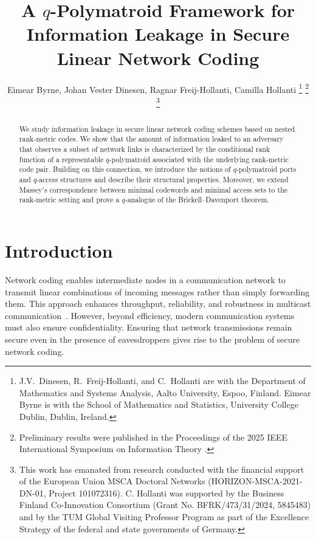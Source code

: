 \documentclass[onecolumn,draftclsnofoot,12pt]{IEEEtran}
\theoremstyle{plain} %
\theoremstyle{definition}
\begin{document}
\title{A $q$-Polymatroid Framework for Information Leakage in Secure Linear Network Coding}
\author{Eimear Byrne, Johan Vester Dinesen, Ragnar Freij-Hollanti, Camilla Hollanti
\thanks{J.V.~Dinesen, R.~Freij-Hollanti, and  C.~Hollanti are with the Department of Mathematics and Systems Analysis, Aalto University, Espoo, Finland. Eimear Byrne is with the School of Mathematics and Statistics, University College Dublin, Dublin, Ireland.}
\thanks{Preliminary results were published in the Proceedings of the 2025 IEEE International Symposium on Information Theory \cite{dinesen2025secretsharingrankmetric}.}
\thanks{This work has emanated from research conducted with the ﬁnancial support of the European Union MSCA Doctoral Networks (HORIZON-MSCA-2021-DN-01, Project 101072316). C. Hollanti was supported by the Business Finland Co-Innovation Consortium (Grant No. BFRK/473/31/2024, 5845483) and by the TUM Global Visiting Professor Program as part of the Excellence Strategy of the federal and state governments of Germany.}
}


\maketitle

\begin{abstract}
We study information leakage in secure linear network coding schemes based on nested rank-metric codes. We show that the amount of information leaked to an adversary that observes a subset of network links is characterized by the conditional rank function of a representable $q$-polymatroid associated with the underlying rank-metric code pair. Building on this connection, we introduce the notions of $q$-polymatroid ports and $q$-access structures and describe their structural properties. Moreover, we extend Massey's correspondence between minimal codewords and minimal access sets to the rank-metric setting and prove a $q$-analogue of the Brickell--Davenport theorem.

\end{abstract}

\section{Introduction}

Network coding enables intermediate nodes in a communication network to transmit linear combinations of incoming messages rather than simply forwarding them. This approach enhances throughput, reliability, and robustness in multicast communication~\cite{informationflow,linearnetworkcoding}. However, beyond efficiency, modern communication systems must also ensure confidentiality. Ensuring that network transmissions remain secure even in the presence of eavesdroppers gives rise to the problem of secure network coding.
\end{document}
